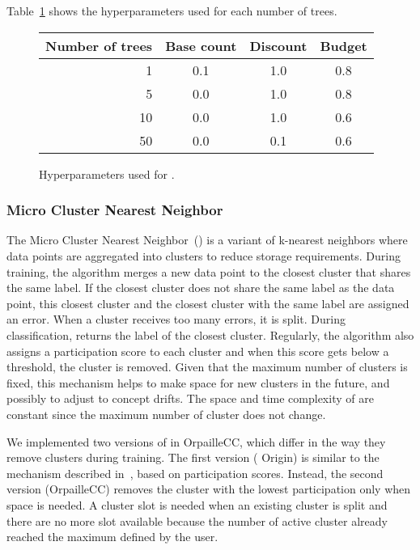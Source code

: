Table~\ref{table:hyperparameter-mondrian} shows
the hyperparameters used for each number of trees.
\begin{figure}
	\begin{center}
		\begin{tabular}{|| r | c | c | c ||} 
			\hline
			Number of trees &  Base count & Discount & Budget \\ [0.5ex] 
			\hline\hline
			1 & 0.1 & 1.0 & 0.8 \\
			5 & 0.0 & 1.0 & 0.8 \\
			10 & 0.0 & 1.0 & 0.6 \\
			50 & 0.0 & 0.1 & 0.6 \\
			\hline
		\end{tabular}
	\end{center}
	\caption{Hyperparameters used for \mondrianforest.}
		\label{table:hyperparameter-mondrian}
\end{figure}


\subsubsection{Micro Cluster Nearest Neighbor~\cite{mc-nn}}
The Micro Cluster Nearest Neighbor~(\mcnn) is a
variant of k-nearest neighbors where data points
are aggregated into clusters to reduce storage
requirements.  During training, the algorithm
merges a new data point to the closest cluster
that shares the same label. If the closest cluster
does not share the same label as the data point,
this closest cluster and the closest cluster with
the same label are assigned an error. When a
cluster receives too many errors, it is split.
During classification, \mcnn returns the label of
the closest cluster.  Regularly, the algorithm
also assigns a participation score to each cluster
and when this score gets below a threshold, the
cluster is removed. Given that the maximum number
of clusters is fixed, this mechanism helps to make
space for new clusters in the future, and possibly
to adjust to concept drifts.  
The space and time complexity of \mcnn are
constant since the maximum number of cluster does
not change.

We implemented two versions of \mcnn in
OrpailleCC, which differ in the way they remove
clusters during training. The first version (\mcnn
Origin) is similar to the mechanism described
in~\cite{mc-nn}, based on participation scores.
Instead, the second version (\mcnn OrpailleCC)
removes the cluster with the lowest participation
only when space is needed.  A cluster slot is
needed when an existing cluster is split and there
are no more slot available because the number of
active cluster already reached the maximum defined
by the user.

